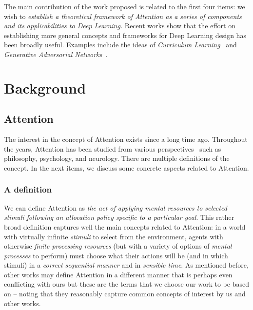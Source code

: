 \documentclass[12pt]{article}
\begin{document}
The main contribution of the work proposed is related to the first four items:
we wish to
\emph{establish a theoretical framework of Attention as a series of components
    and its applicabilities to Deep Learning.}
Recent works show that the effort on establishing more general concepts and frameworks for
Deep Learning design has been broadly useful.
Examples include the ideas of \emph{Curriculum Learning}~\cite{ref:curriculum}
and \emph{Generative Adversarial Networks}~\cite{ref:gans}.

\newpage
\section{Background}
\subsection{Attention}
\label{attention}
The interest in the concept of Attention exists since a long time ago.
Throughout the years, Attention has been studied
from various perspectives~\cite{ref:esther-thesis}
such as philosophy, psychology, and neurology.
There are multiple definitions of the concept.
In the next items, we discuss some concrete aspects related to Attention.

\subsubsection{A definition}
\label{sec:attdef}
We can define Attention as
\emph{the act of applying mental resources to selected stimuli following an allocation policy specific to
    a particular goal}.
This rather broad definition captures well the main concepts related to Attention:
in a world with virtually infinite
\emph{stimuli} to select from the environment, agents with otherwise \emph{finite processing
resources} (but with a variety of options of \emph{mental processes} to perform) must choose what their
actions will be (and in which stimuli) in a \emph{correct sequential manner} and in \emph{sensible time}.
As mentioned before, other works may define Attention in a different manner
that is perhaps even conflicting with ours but
these are the terms that we choose our work to be based on -- noting that they
reasonably capture common concepts of interest by us and other works.~\cite{ref:helgason}
\end{document}
